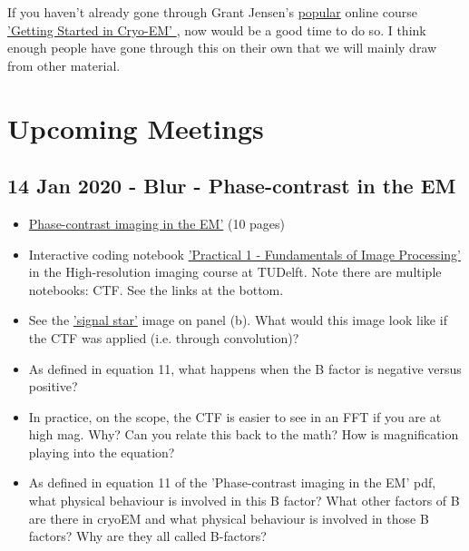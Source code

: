 \documentclass[11pt, oneside]{article}   	%
\begin{document}
If you haven't already gone through Grant Jensen's \href{https://www.caltech.edu/about/news/grant-jensen-cryo-em}{popular} online course \href{https://jensenlab.caltech.edu/courses/}{'Getting Started in Cryo-EM' }, now would be a good time to do so. I think enough people have gone through this on their own that we will mainly draw from other material. 

\pagebreak
\section{Upcoming Meetings}

\pagebreak
\subsection{14 Jan 2020 - Blur - Phase-contrast in the EM}
\begin{itemize}
	\item \href{https://cryoemprinciples.yale.edu/sites/default/files/files/2%20Phase%20contrast.pdf}{Phase-contrast imaging in the EM'} (10 pages)
	\item Interactive coding notebook \href{https://gitlab.tudelft.nl/aj-lab/teaching/-/wikis/NB4020}{'Practical 1 - Fundamentals of Image Processing'} in the High-resolution imaging course at TUDelft. Note there are multiple notebooks: CTF. See the links at the bottom.
\end{itemize}
\begin{itemize}
	\item See the  \href{https://static5.olympus-lifescience.com/data/olympusmicro/primer/images/mtf/modulationfigure6.jpg?rev=480E}{'signal star'} image on panel (b).
What would this image look like if the CTF was applied (i.e. through convolution)?
	\item As defined in equation 11, what happens when the B factor is negative versus positive?
	\item In practice, on the scope, the CTF is easier to see in an FFT if you are at high mag. Why? Can you relate this back to the math? How is magnification playing into the equation?
	\item As defined in equation 11 of the 'Phase-contrast imaging in the EM' pdf, what physical behaviour is involved in this B factor? What other factors of B are there in cryoEM and what physical behaviour is involved in those B factors? Why are they all called B-factors?
\end{itemize}
\end{document}
